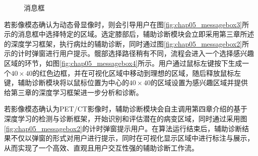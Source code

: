 \begin{figure}[htbp]
  \centering
  \label{fig:chap05_messagebox}
  \caption{消息框}
\end{figure}

若影像模态确认为动态骨显像时，则会引导用户在图\ref{fig:chap05_messagebox3}所示的消息框中选择特定的区域。选定膝部后，辅助诊断模块会立即采用第三章所述的深度学习框架，执行病灶的辅助诊断，同时通过图\ref{fig:chap05_messagebox2}所示的计时弹窗进行用户提示。髋部选择路径稍有不同，流程会进入一个选择感兴趣区域的环节，如图\ref{fig:chap05_messagebox4}所示。用户通过鼠标左键按下生成一个\(40 \times 40\)的红色边框，并在可视化区域中移动到理想的区域，随后释放鼠标左键，辅助诊断模块将以鼠标位置为中心的\(40 \times40 \)的区域设置为感兴趣区域并提供给第三章的深度学习框架进一步分析和诊断。

若影像模态确认为PET/CT影像时，辅助诊断模块会自主调用第四章介绍的基于深度学习的检测与诊断框架，开始识别和评估潜在的病变区域，同时通过采用图\ref{fig:chap05_messagebox2}的计时弹窗提示用户。在算法运行结束后，辅助诊断结果不仅以弹窗的形式对用户进行提示，同时在可视化显示区域中进行标注与展示，从而实现了一个高效、直观且用户交互性强的辅助诊断工作流。

